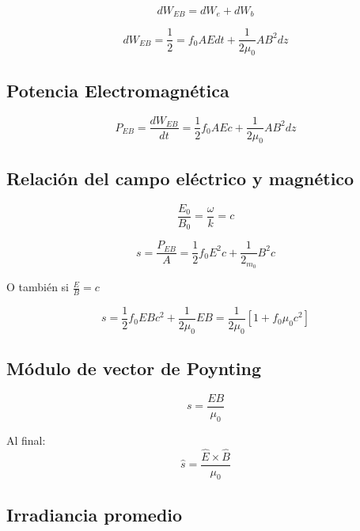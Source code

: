 \documentclass[]{article}
\begin{document}
\begin{equation}
dW_{EB}=dW_e+dW_b
\end{equation}

\begin{equation}
dW_{EB}=\frac{1}{2}=f_0AEdt+\frac{1}{2 \mu_0}AB^2dz
\end{equation}


\subsection{Potencia Electromagnética}

\begin{equation}
P_{EB}=\frac{dW_{EB}}{dt}=\frac{1}{2}f_0AEc+\frac{1}{2 \mu_0}AB^2dz
\end{equation}


\subsection{Relación del campo eléctrico y magnético}

\begin{equation}
\frac{E_0}{B_0}=\frac{\omega}{k}=c
\end{equation}

\begin{equation}
s=\frac{P_{EB}}{A}=\frac{1}{2}f_0E^2c+\frac{1}{2_{m_0}}B^2c
\end{equation}

O también si $\frac{E}{B}=c$

\begin{equation}
s= \frac{1}{2}f_0EBc^2+\frac{1}{2 \mu_0}EB=\frac{1}{2 \mu_0}[1+f_0 \mu_0c^2]
\end{equation}

\subsection{Módulo de vector de Poynting}

\begin{equation}
s=\frac{EB}{\mu_0}
\end{equation}

Al final:\\

\begin{equation}
\hat{s}=\frac{\hat{E} \times \hat{B}}{\mu_0}
\end{equation}

\subsection{Irradiancia promedio}
\end{document}
